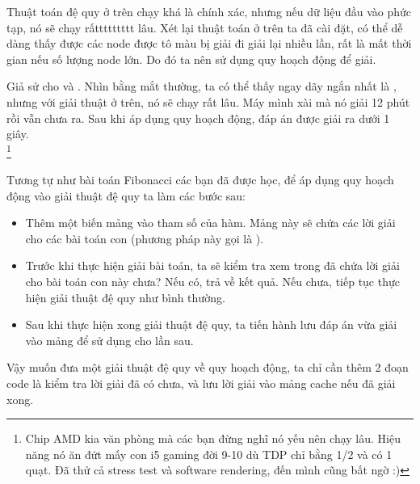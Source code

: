 \documentclass[main.tex]{subfiles}
\begin{document}
Thuật toán đệ quy ở trên chạy khá là chính xác, nhưng nếu dữ liệu đầu vào phức tạp, nó sẽ chạy rấttttttttt lâu.
Xét lại thuật toán ở trên ta đã cài đặt, có thể dễ dàng thấy được các node được tô màu bị giải đi giải lại nhiều lần, rất là mất thời gian nếu số lượng node lớn. Do đó ta nên sử dụng quy hoạch động để giải. 

\begin{center}
\end{center}

Giả sử cho  và . Nhìn bằng mắt thường, ta có thể thấy ngay dãy ngắn nhất là , nhưng với giải thuật ở trên, nó sẽ chạy rất lâu. Máy mình xài  mà nó giải 12 phút rồi vẫn chưa ra. Sau khi áp dụng quy hoạch động, đáp án được giải ra dưới 1 giây.\\
\footnote{Chip AMD kia văn phòng mà các bạn đừng nghĩ nó yếu nên chạy lâu. Hiệu năng nó ăn đứt mấy con i5 gaming đời 9-10 dù TDP chỉ bằng 1/2 và có 1 quạt. Đã thử cả stress test và software rendering, đến mình cũng bất ngờ :)}

Tương tự như bài toán Fibonacci các bạn đã được học, để áp dụng quy hoạch động vào giải thuật đệ quy ta làm các bước sau:
\begin{itemize}
    \item Thêm một biến mảng vào tham số của hàm. Mảng này sẽ chứa các lời giải cho các bài toán con (phương pháp này gọi là ).
    \item Trước khi thực hiện giải bài toán, ta sẽ kiểm tra xem trong  đã chứa lời giải cho bài toán con này chưa? Nếu có, trả về kết quả. Nếu chưa, tiếp tục thực hiện giải thuật đệ quy như bình thường.
    \item Sau khi thực hiện xong giải thuật đệ quy, ta tiến hành lưu đáp án vừa giải vào mảng  để sử dụng cho lần sau.
\end{itemize}
Vậy muốn đưa một giải thuật đệ quy về quy hoạch động, ta chỉ cần thêm 2 đoạn code là kiểm tra lời giải đã có chưa, và lưu lời giải vào mảng \code cache nếu đã giải xong.
\end{document}
